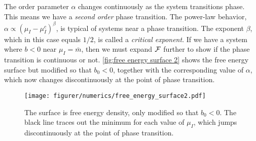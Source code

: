 The order parameter $\alpha$ changes continuously as the system transitions phase.
This means we have a \emph{second order} phase transition.
The power-law behavior, $\alpha \propto (\mu_I - \mu_I^c)^\beta$, is typical of systems near a phase transition.
The exponent $\beta$, which in this case equals $1/2$, is called a \emph{critical exponent}.
If we have a system where $b < 0$ near $\mu_I = \bar m$, then we must expand $\mathcal{F}$ further to show if the phase transition is continuous or not.
\autoref{fig:free energy surface 2} shows the free energy surface but modified so that $b_0 < 0$, together with the corresponding value of $\alpha$, which now changes discontinuously at the point of phase transition.
\begin{figure}[h]
    \centering
    \texttt{[image: figurer/numerics/free\_energy\_surface2.pdf]}
    \caption{The surface is free energy density, only modified so that $b_0<0$. The black line traces out the minimum for each value of $\mu_I$, which jumps discontinuously at the point of phase transition.}
    \label{fig:free energy surface 2}
\end{figure}


